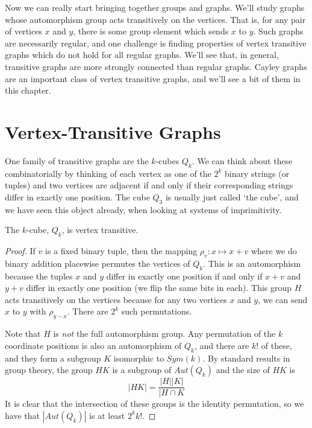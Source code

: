 \renewcommand{\exc}[1]{\subsubsection*{Exercise 3.#1}}




Now we can really start bringing together groups and graphs.  We'll study graphs whose automorphism group acts transitively on the vertices.  That is, for any pair of vertices $x$ and $y$, there is some group element which sends $x$ to $y$.  Such graphs are necessarily regular, and one challenge is finding properties of vertex transitive graphs which do not hold for all regular graphs.  We'll see that, in general, transitive graphs are more strongly connected than regular graphs.  Cayley graphs are an important class of vertex transitive graphs, and we'll see a bit of them in this chapter.



\section*{Vertex-Transitive Graphs}


One family of transitive graphs are the $k$-cubes $Q_k$.  We can think about these combinatorially by thinking of each vertex as one of the $2^k$ binary strings (or tuples) and two vertices are adjacent if and only if their corresponding strings differ in exactly one position.  The cube $Q_3$ is usually just called `the cube', and we have seen this object already, when looking at systems of imprimitivity.

\begin{lemma}
The $k$-cube, $Q_k$, is vertex transitive.
\end{lemma}

\begin{proof}
If $v$ is a fixed binary tuple, then the mapping $\rho_v:x\mapsto x+v$ where we do binary addition placewise permutes the vertices of $Q_k$.  This is an automorphism because the tuples $x$ and $y$ differ in exactly one position if and only if $x+v$ and $y+v$ differ in exactly one position (we flip the same bits in each).  This group $H$ acts transitively on the vertices because for any two vertices $x$ and $y$, we can send $x$ to $y$ with $\rho_{y-x}$. There are $2^k$ such permutations. 

Note that $H$ is \textit{not} the full automorphism group.  Any permutation of the $k$ coordinate positions is also an automorphism of $Q_k$, and there are $k!$ of these, and they form a subgroup $K$ isomorphic to $Sym(k)$.  By standard results in group theory, the group $HK$ is a subgroup of $Aut(Q_k)$ and the size of $HK$ is
$$|HK|=\frac{|H||K|}{|H\cap K}$$
It is clear that the intersection of these groups is the identity permutation, so we have that $|Aut(Q_k)|$ is at least $2^kk!$. 
\end{proof}

